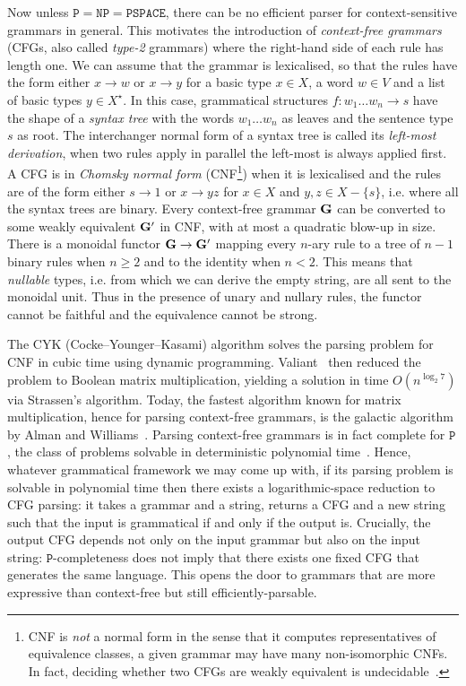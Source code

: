 Now unless $\mathtt{P} = \mathtt{NP} = \mathtt{PSPACE}$, there can be no efficient parser for context-sensitive grammars in general.
This motivates the introduction of \emph{context-free grammars} (CFGs, also called \emph{type-2} grammars) where the right-hand side of each rule has length one.
We can assume that the grammar is lexicalised, so that the rules have the form either $x \to w$ or $x \to y$ for a basic type $x \in X$, a word $w \in V$ and a list of basic types $y \in X^\star$.
In this case, grammatical structures $f : w_1 \dots w_n \to s$ have the shape of a \emph{syntax tree} with the words $w_1 \dots w_n$ as leaves and the sentence type $s$ as root.
The interchanger normal form of a syntax tree is called its \emph{left-most derivation}, when two rules apply in parallel the left-most is always applied first.
A CFG is in \emph{Chomsky normal form} (CNF\footnote
{CNF is \emph{not} a normal form in the sense that it computes representatives of equivalence classes, a given grammar may have many non-isomorphic CNFs.
In fact, deciding whether two CFGs are weakly equivalent is undecidable~\cite[Theorem~26]{Chomsky63}.}) when it is lexicalised and the rules are of the form either $s \to 1$ or $x \to y z$ for $x \in X$ and $y, z \in X - \{ s \}$, i.e. where all the syntax trees are binary.
Every context-free grammar $\mathbf{G}$ can be converted to some weakly equivalent $\mathbf{G}'$ in CNF, with at most a quadratic blow-up in size.
There is a monoidal functor $\mathbf{G} \to \mathbf{G}'$ mapping every $n$-ary rule to a tree of $n - 1$ binary rules when $n \geq 2$ and to the identity when $n < 2$.
This means that \emph{nullable} types, i.e. from which we can derive the empty string, are all sent to the monoidal unit.
Thus in the presence of unary and nullary rules, the functor cannot be faithful and the equivalence cannot be strong.

The CYK (Cocke–Younger–Kasami) algorithm solves the parsing problem for CNF in cubic time using dynamic programming.
Valiant~\cite{Valiant75} then reduced the problem to Boolean matrix multiplication, yielding a solution in time $O(n^{\log_2 7})$ via Strassen's algorithm.
Today, the fastest algorithm known for matrix multiplication, hence for parsing context-free grammars, is the galactic algorithm by Alman and Williams~\cite{AlmanWilliams20}.
Parsing context-free grammars is in fact complete for $\mathtt{P}$, the class of problems solvable in deterministic polynomial time~\cite{JonesLaaser74}.
Hence, whatever grammatical framework we may come up with, if its parsing problem is solvable in polynomial time then there exists a logarithmic-space reduction to CFG parsing: it takes a grammar and a string, returns a CFG and a new string such that the input is grammatical if and only if the output is.
Crucially, the output CFG depends not only on the input grammar but also on the input string: $\mathtt{P}$-completeness does not imply that there exists one fixed CFG that generates the same language.
This opens the door to grammars that are more expressive than context-free but still efficiently-parsable.

